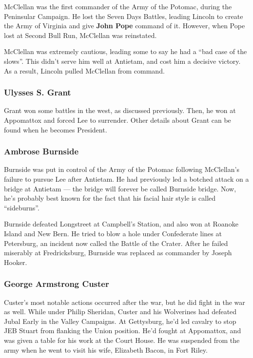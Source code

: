 McClellan was the first commander of the Army of the Potomac, during the Peninsular Campaign.
He lost the Seven Days Battles,
leading Lincoln to create the Army of Virginia and give \textbf{John Pope} command of it.
However, when Pope lost at Second Bull Run, McClellan was reinstated.

McClellan was extremely cautious, leading some to say he had a ``bad case of the slows''.
This didn't serve him well at Antietam, and cost him a decisive victory.
As a result, Lincoln pulled McClellan from command.

\subsubsection*{Ulysses S. Grant}

Grant won some battles in the west, as discussed previously.
Then, he won at Appomattox and forced Lee to surrender.
Other details about Grant can be found when he becomes President.

\subsubsection*{Ambrose Burnside}

Burnside was put in control of the Army of the Potomac following McClellan's failure to pursue Lee after Antietam.
He had previously led a botched attack on a bridge at Antietam --- the bridge will forever be called Burnside bridge.
Now, he's probably best known for the fact that his facial hair style is called ``sideburns''.

Burnside defeated Longstreet at Campbell's Station, and also won at Roanoke Island and New Bern.
He tried to blow a hole under Confederate lines at Petersburg, an incident now called the Battle of the Crater.
After he failed miserably at Fredricksburg, Burnside was replaced as commander by Joseph Hooker.


\subsubsection*{George Armstrong Custer}

Custer's most notable actions occurred after the war, but he did fight in the war as well.
While under Philip Sheridan, Custer and his Wolverines had defeated Jubal Early in the Valley Campaigns.
At Gettysburg, he'd led cavalry to stop JEB Stuart from flanking the Union position.
He'd fought at Appomattox, and was given a table for his work at the Court House.
He was suspended from the army when he went to visit his wife, Elizabeth Bacon, in Fort Riley.

